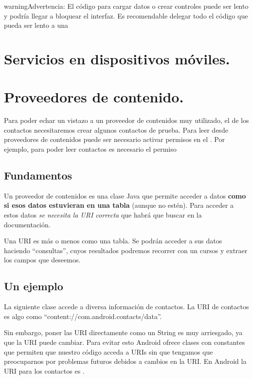 \documentclass[a4paper,12pt,spanish]{sphinxmanual}
\begin{document}
\begin{notice}{warning}{Advertencia:}
El código para cargar datos o crear controles puede ser lento y podría llegar a bloquear el interfaz. Es recomendable delegar todo el código que pueda ser lento a una 
\end{notice}


\section{Servicios en dispositivos móviles.}
\label{tema2:servicios-en-dispositivos-moviles}

\section{Proveedores de contenido.}
\label{tema2:proveedores-de-contenido}
Para poder echar un vistazo a un proveedor de contenidos muy utilizado, el de los contactos necesitaremos crear algunos contactos de prueba. Para leer desde proveedores de contenidos puede ser necesario activar permisos en el . Por ejemplo, para poder leer contactos es necesario el permiso 


\subsection{Fundamentos}
\label{tema2:fundamentos}
Un proveedor de contenidos es una clase Java que permite acceder a datos \textbf{como si esos datos estuvieran en una tabla} (aunque no estén). Para acceder a estos datos \emph{se necesita la URI correcta} que habrá que buscar en la documentación.

Una URI es más o menos como una tabla. Se podrán acceder a sus datos haciendo ``consultas'', cuyos resultados podremos recorrer con un cursos y extraer los campos que deseemos.


\subsection{Un ejemplo}
\label{tema2:un-ejemplo}
La siguiente clase accede a diversa información de contactos. La URI de contactos es algo como ``content://com.android.contacts/data''.

Sin embargo, poner las URI directamente como un String es muy arriesgado, ya que la URI puede cambiar. Para evitar esto Android ofrece clases con constantes que permiten que nuestro código acceda a URIs sin que tengamos que preocuparnos por problemas futuros debidos a cambios en la URI. En Android la URI para los contactos es .
\end{document}
